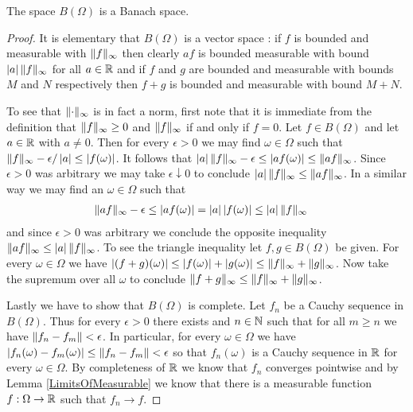 \begin{prop}The space $B(\Omega)$ is a Banach space.
\end{prop}
\begin{proof}
It is elementary that $B(\Omega)$ is a vector space : if $f$ is bounded and measurable with $\lVert f \rVert_\infty$ then clearly $af$ is bounded measurable with bound $\left \vert a \right \vert\lVert f \rVert_\infty$ for all $a \in \mathbb{R}$ and if $f$ and $g$ are bounded and measurable with bounds $M$ and $N$ respectively then $f+g$ is bounded and measurable with bound $M+N$.

To see that $\lVert \cdot \rVert_\infty$ is in fact a norm, first note that it is immediate from the definition that $\lVert f \rVert_\infty \geq 0$ and $\lVert f \rVert_\infty$ if and only if $f = 0$.  Let $f \in B(\Omega)$ and let $a \in \mathbb{R}$ with $a \neq 0$.  Then for every $\epsilon>0$ we may find $\omega \in \Omega$ such that $\lVert f \rVert_\infty - \epsilon/\left \vert a \right \vert \leq \left \vert f(\omega) \right \vert$.  It follows that $\left \vert a \right \vert \lVert f \rVert_\infty - \epsilon \leq \left \vert a f (\omega) \right \vert \leq \lVert af \rVert_\infty$.  Since $\epsilon >0$  was arbitrary we may take $\epsilon \downarrow 0$ to conclude $\left \vert a \right \vert \lVert f \rVert_\infty \leq \lVert af \rVert_\infty$.  In a similar way we may find an $\omega \in \Omega$ such that 
\begin{align*}
\lVert af \rVert_\infty - \epsilon &\leq \left \vert af(\omega) \right \vert = \left \vert a \right \vert\left \vert f(\omega) \right \vert \leq \left \vert a \right \vert \lVert f \rVert_\infty
\end{align*}
and since $\epsilon > 0$ was arbitrary we conclude the opposite inequality $\lVert af \rVert_\infty \leq \left \vert a \right \vert \lVert f \rVert_\infty$.  To see the triangle inequality let $f, g \in B(\Omega)$ be given.  For every $\omega \in \Omega$ we have $\left \vert (f+g)(\omega) \right \vert \leq \left \vert f(\omega) \right \vert+\left \vert g(\omega) \right \vert \leq \lVert f \rVert_\infty + \lVert g \rVert_\infty$.  Now take the supremum over all $\omega$ to conclude $\lVert f+g \rVert_\infty \leq \lVert f \rVert_\infty + \lVert g \rVert_\infty$.

Lastly we have to show that $B(\Omega)$ is complete.  Let $f_n$ be a Cauchy sequence in $B(\Omega)$.  Thus for every $\epsilon > 0$ there exists and $n \in \mathbb{N}$ such that for all $m \geq n$ we have $\lVert f_n - f_m \rVert < \epsilon$.  In particular, for every $\omega \in \Omega$ we have $\left \vert f_n(\omega) - f_m(\omega) \right \vert \leq \lVert f_n - f_m \rVert < \epsilon$ so that $f_n(\omega)$ is a Cauchy sequence in $\mathbb{R}$ for every $\omega \in \Omega$.  By completeness of $\mathbb{R}$ we know that $f_n$ converges pointwise and by Lemma \ref{LimitsOfMeasurable} we know that there is a measurable function $f : \Omega \to \mathbb{R}$ such that $f_n \to f$.  


\end{proof}
